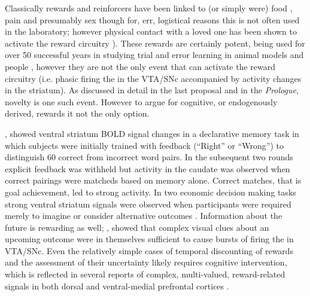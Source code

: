 \documentclass[doc,12pt]{apa}        %
\begin{document}
Classically rewards and reinforcers have been linked to (or simply were) food \cite{ODoherty:2006p2875}, pain \cite{Becerra:2011p7581,schultz:2007aa} and presumably sex though for, err, logistical reasons this is not often used in the laboratory; however physical contact with a loved one has been shown to activate the reward circuitry \cite{Izuma:2008p2822,Fliessbach:2007gf}).  These rewards are certainly potent, being used for over 50 successful years in studying trial and error learning in animal models \cite{iversen:2007aa} and people \cite{Kim:2010p7248,Montague:2006mz}, however they are not the only event that can activate the reward circuitry (i.e. phasic firing the in the VTA/SNc accompanied by activity changes in the striatum).  As discussed in detail in the last proposal and in the \emph{Prologue}, novelty is one such event.  However to argue for cognitive, or endogenously derived, rewards it not the only option.  

, showed ventral striatum BOLD signal changes in a declarative memory task in which subjects were initially trained with feedback (``Right'' or ``Wrong'') to distinguish 60 correct from incorrect word pairs.  In the subsequent two rounds explicit feedback was withheld but activity in the caudate was observed when correct pairings were matcheds based on memory alone.  Correct matches, that is goal achievement, led to strong activity.  In two economic decision making tasks strong ventral striatum signals were observed when participants were required merely to imagine or consider alternative outcomes  \cite{Hayden:2009p6545,Lohrenz:2007p7240}.  Information about the future is rewarding as well; , showed that complex visual clues about an upcoming outcome were in themselves sufficient to cause bursts of firing the in VTA/SNc.  Even the relatively simple cases of temporal discounting of rewards and the assessment of their uncertainty likely requires cognitive intervention, which is reflected in several reports of complex, multi-valued, reward-related signals in both dorsal and ventral-medial prefrontal cortices \cite{Tobler:2009p8302,Wallis:2010p8303,Kim:2009p8304,Seymour:2008p6518}.
\end{document}
